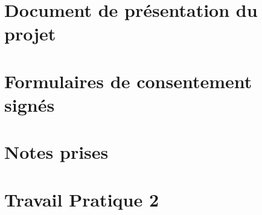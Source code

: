 \documentclass[letterpaper, oneside, 12pt, these, creativecommons]{thETS}
\begin{document}
\appendix
\multiannexe

\chapter{Document de présentation du projet}



\chapter{Formulaires de consentement signés}

%
%
%
%

\chapter{Notes prises}

%
%
%
%
%

\chapter{Travail Pratique 2}

%
\end{document}
